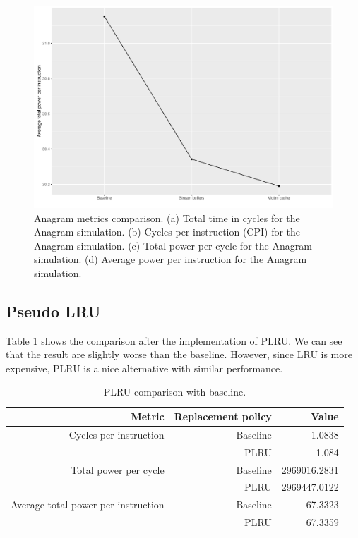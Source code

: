 \documentclass[10pt]{scrartcl}
\begin{document}
\begin{figure}[h!]
\endminipage
{}%
  \includegraphics[width=\linewidth]{./Plots/anagram_4.pdf}
\endminipage
\caption{Anagram metrics comparison. (a) Total time in cycles for the Anagram simulation. (b) Cycles per instruction (CPI) for the Anagram simulation. (c) Total power per cycle for the Anagram simulation. (d) Average power per instruction for the Anagram simulation.}\label{fig:anagram}
\end{figure}

\FloatBarrier
\subsection{Pseudo LRU}
Table \ref{tab:gcc_plru} shows the comparison after the implementation of PLRU. We can see that the result are slightly worse than the baseline.  However, since LRU is more expensive, PLRU is a nice alternative with similar performance. 

\begin{table}[h]
 \centering
 \begin{center}
\begin{tabular}{rrr}
\toprule
Metric & Replacement policy& Value \\
\midrule
Cycles per instruction & 	Baseline & 	1.0838 \\
	 & PLRU & 	1.084 \\
Total power per cycle & 	Baseline & 	2969016.2831 \\
	 & PLRU & 	2969447.0122 \\
Average total power per instruction & 	Baseline & 	67.3323 \\
	 & PLRU	 & 67.3359 \\
\bottomrule
 \end{tabular}
 \end{center}
 \caption{PLRU comparison with baseline.}
 \label{tab:gcc_plru}
\end{table}
\end{document}
